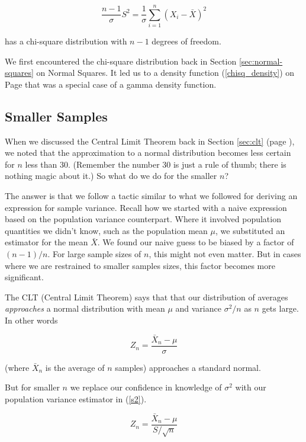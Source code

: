 \documentclass[]{article}
\begin{document}
\begin{equation} \label{chisq2}
\frac{n-1}{\sigma} S^2 =
\frac{1}{\sigma}\sum_{i=1}^n (X_i - \bar{X})^2
\end{equation}

has a chi-square distribution with $n-1$ degrees of freedom.

We first encountered the chi-square distribution back in
Section \ref{sec:normal-squares} on Normal Squares.  It
led us to a density function (\ref{chisq_density}) on Page
\pageref{chisq_density} that was a special case of a
gamma density function.  

\subsection{Smaller Samples}

When we discussed the Central Limit Theorem back in 
Section \ref{sec:clt} (page \pageref{sec:clt}), we noted
that the approximation to a normal distribution becomes
less certain for $n$ less than 30.  (Remember the number
30 is just a rule of thumb; there is nothing magic about
it.)  So what do we do for the smaller $n$?

The answer is that we follow a tactic similar to what
we followed for deriving an expression for sample variance.
Recall how we started with a naive expression based on
the population variance counterpart.  Where it involved
population quantities we didn't know, such as the population
mean $\mu$, we substituted an estimator for the mean
$\bar{X}$.  We found our naive guess to be biased by
a factor of $(n-1)/n$.  For large sample sizes of $n$,
this might not even matter.  But in cases where we are
restrained to smaller samples sizes, this factor becomes
more significant.

The CLT (Central Limit Theorem) says that that our
distribution of averages \emph{approaches} a normal
distribution with mean $\mu$ and variance
$\sigma^2/n$ as $n$ gets large.  In other words

$$
Z_n = \frac{\bar{X}_n - \mu}{\sigma}
$$

(where $\bar{X}_n$ is the average of $n$ samples)
approaches a standard normal.

But for smaller $n$
we replace our confidence in knowledge of $\sigma^2$
with our population variance estimator in (\ref{s2}).

\begin{equation}
Z_n = \frac{\bar{X}_n - \mu}{S/\sqrt{n}} \label{t1}
\end{equation}
\end{document}

